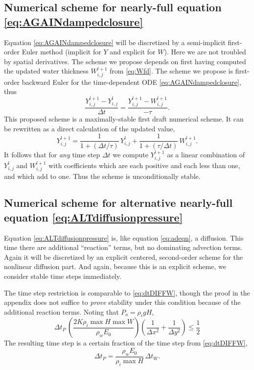 \documentclass[12pt,final]{amsart}%
\begin{document}
\subsection*{Numerical scheme for nearly-full equation \eqref{eq:AGAINdampedclosure}}    Equation \eqref{eq:AGAINdampedclosure} will be discretized by a semi-implicit first-order Euler method (implicit for $Y$ and explicit for $W$).  Here we are not troubled by spatial derivatives.  The scheme we propose depends on first having computed the updated water thickness $W_{i,j}^{l+1}$ from \eqref{eq:Wfd}.  The scheme we propose is first-order backward Euler \citep{BurdenFaires} for the time-dependent ODE \eqref{eq:AGAINdampedclosure}, thus
\begin{equation}
\frac{Y_{i,j}^{l+1} - Y_{i,j}^{l}}{\Delta t} = \frac{Y_{i,j}^{l+1} - W_{i,j}^{l+1}}{- \tau}. \label{eq:Yfd}
\end{equation}
This proposed scheme is a maximally-stable first draft numerical scheme.  It can be rewritten as a direct calculation of the updated value,
   $$Y_{i,j}^{l+1} = \frac{1}{1 + (\Delta t/\tau)}\, Y_{i,j}^{l} + \frac{1}{1 + (\tau / \Delta t)}\, W_{i,j}^{l+1}.$$
It follows that for \emph{any} time step $\Delta t$ we compute $Y_{i,j}^{l+1}$ as a linear combination of $Y_{i,j}^{l}$ and $W_{i,j}^{l+1}$ with coefficients which are each positive and each less than one, and which add to one.  Thus the scheme is unconditionally stable.


\subsection*{Numerical scheme for alternative nearly-full equation \eqref{eq:ALTdiffusionpressure}}   Equation \eqref{eq:ALTdiffusionpressure} is, like equation \eqref{eq:adeqn}, a diffusion.  This time there are additional ``reaction'' terms, but no dominating advection terms.  Again it will be discretized by an explicit centered, second-order scheme for the nonlinear diffusion part.  And again, because this is an explicit scheme, we consider stable time steps immediately.

The time step restriction is comparable to \eqref{eq:dtDIFFW}, though the proof in the appendix does not suffice to \emph{prove} stability under this condition because of the additional reaction terms.  Noting that $P_o=\rho_i g H$,
\begin{equation}
\Delta t_P\, \left(\frac{2 K \rho_i \max H \max W}{\rho_w E_0}\right) \left(\frac{1}{\Delta x^2} + \frac{1}{\Delta y^2}\right) \le \frac{1}{2} \label{eq:dtDIFFP}
\end{equation}
The resulting time step is a certain fraction of the time step from \eqref{eq:dtDIFFW},
\begin{equation}
\Delta t_P = \frac{\rho_w E_0}{\rho_i \max H}\, \Delta t_W.
\end{equation}
\end{document}
